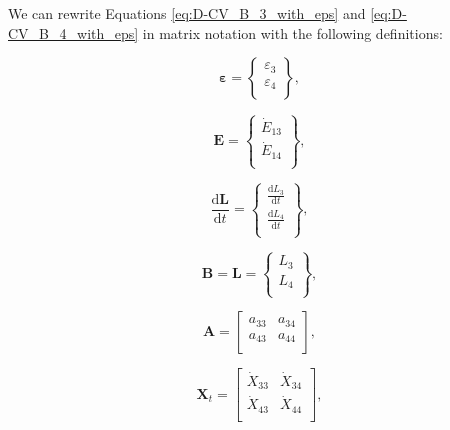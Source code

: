 \documentclass[authoryear,preprint,review,12pt]{elsarticle}
\renewcommand{\vec}[1]{\mathbf{#1}}
\begin{document}
We can rewrite Equations \ref{eq:D-CV_B_3_with_eps} and \ref{eq:D-CV_B_4_with_eps} in matrix notation with the following definitions:

\begin{equation} \label{eq:D-eps_vec_def}
	\vec{\varepsilon} =		\begin{Bmatrix} 	\varepsilon_{3}	\\
																\varepsilon_{4}	\\
									\end{Bmatrix},
\end{equation}

\begin{equation} \label{eq:D-E_vec_def}
	\vec{E} =		\begin{Bmatrix} 	\dot{E}_{13}	\\
													\dot{E}_{14}\\
						\end{Bmatrix},
\end{equation}

\begin{equation} \label{eq:D-dLdt_vec_def}
	\frac{\mathrm{d}\vec{L}}{\mathrm{d}t} =	\begin{Bmatrix}	\frac{\mathrm{d}L_{3}}{\mathrm{d}t}	\\
																									\frac{\mathrm{d}L_{4}}{\mathrm{d}t}\\
																		\end{Bmatrix},
\end{equation}

\begin{equation} \label{eq:B_vec_def}
	\vec{B} =	\vec{L} =		\begin{Bmatrix}	L_{3}\\
																	L_{4}\\
										\end{Bmatrix},
\end{equation}

\begin{equation} \label{eq:D-A_matrix_def}
	\vec{A} =	\begin{bmatrix} 	a_{33} & a_{34}	\\
												a_{43} & a_{44}	\\
					\end{bmatrix},
\end{equation}

\begin{equation} \label{eq:D-X_t_matrix_def}
	\vec{X}_{t} =		\begin{bmatrix} 	\dot{X}_{33}		&	\dot{X}_{34}	\\
														\dot{X}_{43}		&	\dot{X}_{44}\\
							\end{bmatrix},
\end{equation}
\end{document}

